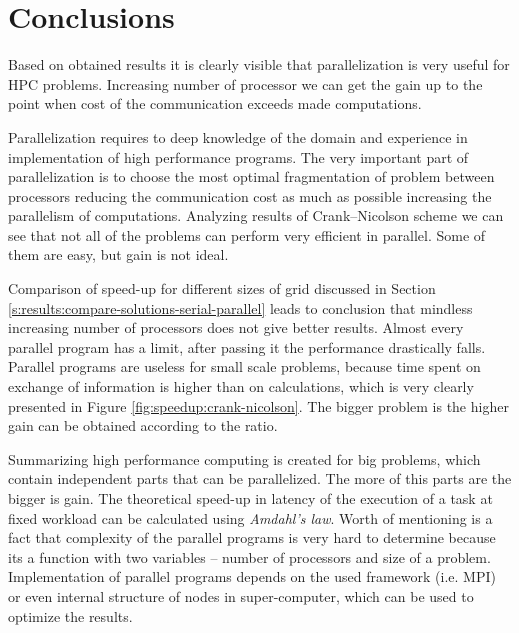 \chapter{Conclusions} \label{chp:summary}
	Based on obtained results it is clearly visible that parallelization is very useful for \gls{HPC} problems. Increasing number of processor we can get the gain up to the point when cost of the communication exceeds made computations. 
	
	Parallelization requires to deep knowledge of the domain and experience in implementation of high performance programs. The very important part of parallelization is to choose the most optimal fragmentation of problem between processors reducing the communication cost as much as possible increasing the parallelism of computations. Analyzing results of Crank--Nicolson scheme we can see that not all of the problems can perform very efficient in parallel. Some of them are easy, but gain is not ideal. 
	
	Comparison of \gls{speed-up} for different sizes of grid discussed in Section \ref{s:results:compare-solutions-serial-parallel} leads to conclusion that mindless increasing number of processors does not give better results. Almost every parallel program has a limit, after passing it the performance drastically falls. Parallel programs are useless for small scale problems, because time spent on exchange of information is higher than on calculations, which is very clearly presented in Figure \ref{fig:speedup:crank-nicolson}. The bigger problem is the higher gain can be obtained according to the  ratio. 
	
	Summarizing high performance computing is created for big problems, which contain independent parts that can be parallelized. The more of this parts are the bigger is gain. The theoretical 
	\gls{speed-up} in latency of the execution of a task at fixed workload can be calculated using \emph{Amdahl's law}. Worth of mentioning is a fact that complexity of the parallel programs is very hard to determine because its a function with two variables -- number of processors and size of a problem. Implementation of parallel programs depends on the used framework (i.e. \gls{MPI}) or even internal structure of nodes in \gls{super-computer}, which can be used to optimize the results.
